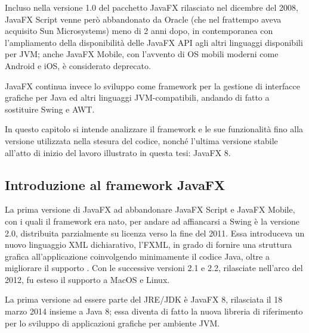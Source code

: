         Incluso nella versione 1.0 del pacchetto JavaFX rilasciato nel dicembre del 2008, JavaFX Script venne però abbandonato da Oracle (che nel frattempo aveva acquisito Sun Microsystems) meno di 2 anni dopo, in contemporanea con l'ampliamento della disponibilità delle JavaFX API agli altri linguaggi disponibili per JVM;
        anche JavaFX Mobile, con l'avvento di OS mobili moderni come Android e iOS, è considerato deprecato.

        JavaFX continua invece lo sviluppo come framework per la gestione di interfacce grafiche per Java ed altri linguaggi JVM-compatibili, andando di fatto a sostituire Swing e AWT.

        In questo capitolo si intende analizzare il framework e le sue funzionalità fino alla versione utilizzata nella stesura del codice, nonché l'ultima versione stabile all'atto di inizio del lavoro illustrato in questa tesi:
        JavaFX 8.

        \subsection{Introduzione al framework JavaFX}\label{subsec:jfxIntro}
            La prima versione di JavaFX ad abbandonare JavaFX Script e JavaFX Mobile, con i quali il framework era nato, per andare ad affiancarsi a Swing è la versione 2.0, distribuita parzialmente su licenza  verso la fine del 2011.
            Essa introduceva un nuovo linguaggio XML dichiarativo, l'FXML, in grado di fornire una struttura grafica all'applicazione coinvolgendo minimamente il codice Java, oltre a migliorare il supporto .
            Con le successive versioni 2.1 e 2.2, rilasciate nell'arco del 2012, fu esteso il supporto a MacOS e Linux.

            La prima versione ad essere parte del JRE/JDK è JavaFX 8, rilasciata il 18 marzo 2014 insieme a Java 8;
            essa diventa di fatto la nuova libreria di riferimento per lo sviluppo di applicazioni grafiche per ambiente JVM.

